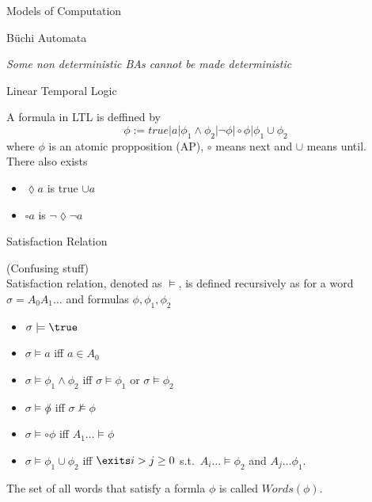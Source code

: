 \documentclass[12pt, letterpaper]{article}
\begin{document}
\begin{section}{Models of Computation}
  \begin{subsection}{B\"uchi Automata}

    \emph{Some non deterministic BAs cannot be made deterministic}

  \end{subsection}

  \begin{subsection}{Linear Temporal Logic}

    A formula in LTL is deffined by
    \[\phi := true | a | \phi_{1} \land \phi_{2} | \lnot \phi | \circ \phi | \phi_{1} \cup \phi_{2}\]
    where \(\phi\) is an atomic propposition (AP), \(\circ\) means next and \(\cup\) means until. \\
    There also exists
    \begin{itemize}
      \item \(\lozenge a\) is true \(\cup a\)
      \item \(\square a\) is \(\lnot \lozenge \lnot a\)
    \end{itemize}

    \begin{subsubsection}{Satisfaction Relation}

      (Confusing stuff) \\
      Satisfaction relation, denoted as \(\models\), is defined recursively as for
      a word \(\sigma = A_{0}A_{1} \dots\) and formulas
      \(\phi, \phi_{1}, \phi_{2}\)
      \begin{itemize}
        \item \(\sigma \models \true\)
        \item \(\sigma \models a\) iff \(a \in A_{0}\)
        \item \(\sigma \models \phi_{1} \land \phi_{2}\) iff
        \(\sigma \models \phi_{1}\) or \(\sigma \models \phi_{2}\)
        \item \(\sigma \models \not \phi\) iff \(\sigma \not\models \phi\)
        \item \(\sigma \models \circ \phi\) iff \(A_{1} \dots \models \phi\)
        \item \(\sigma \models \phi_{1} \cup \phi_{2}\) iff
        \(\exits i > j \geq 0\) s.t.\ \(A_{i} \dots \models \phi_{2}\) and
        \(A_{j} \dots \phi_{1}\).
      \end{itemize}
      The set of all words that satisfy a formla \(\phi\) is called
      \(Words(\phi)\).

    \end{subsubsection}


\end{subsection}
\end{section}
\end{document}
